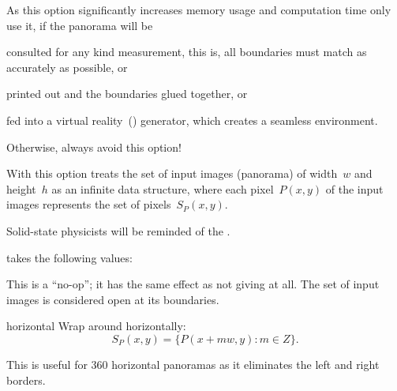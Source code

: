 \begin{codelist}
  As this option significantly increases memory usage and computation time only use it, if the
  panorama will be

  \begin{compactitemize}
  \item
    consulted for any kind measurement, this is, all boundaries must match as accurately as
    possible, or

  \item
    printed out and the boundaries glued together, or

  \item
    fed into a virtual reality~() generator, which creates a seamless environment.
  \end{compactitemize}

  \noindent Otherwise, always avoid this option!

  With this option \App{} treats the set of input images (panorama) of width~$w$ and height~$h$
  as an infinite data structure, where each pixel~$P(x, y)$ of the input images represents the
  set of pixels~$S_P(x, y)$.

  \begin{geeknote}
    Solid-state physicists will be reminded of the
    .
  \end{geeknote}

   takes the following values:

  \begin{codelist}
  \item[\itempar{none \\ open}]\itemend
    This is a ``no-op''; it has the same effect as not giving  at all.  The set
    of input images is considered open at its boundaries.

  \item[horizontal]\itemend
    Wrap around horizontally:
    \[
    S_P(x, y) = \{P(x + m w, y): m \in Z\}.
    \]

    This is useful for 360\angulardegree{} horizontal panoramas as it eliminates the left and
    right borders.


\end{codelist}
\end{codelist}
